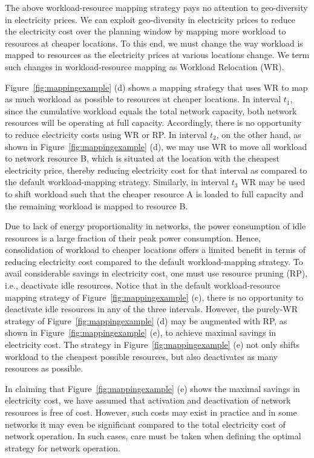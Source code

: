The above workload-resource mapping strategy pays no attention to geo-diversity in electricity prices. We can exploit geo-diversity in electricity prices to reduce the electricity cost over the planning window by mapping more workload to resources at cheaper locations. To this end, we must change the way workload is mapped to resources as the electricity prices at various locations change. We term such changes in workload-resource mapping as Workload Relocation (WR). 

Figure~\ref{fig:mappingexample} (d) shows a mapping strategy that uses WR to map as much workload as possible to resources at cheaper locations. In interval $t_1$, since the cumulative workload equals the total network capacity, both network resources will be operating at full capacity. Accordingly, there is no opportunity to reduce electricity costs using WR or RP. In interval $t_2$, on the other hand, as shown in Figure~\ref{fig:mappingexample} (d), we may use WR to move all workload to network resource B, which is situated at the location with the cheapest electricity price, thereby reducing electricity cost for that interval as compared to the default workload-mapping strategy. Similarly, in interval $t_3$ WR may be used to shift workload such that the cheaper resource A is loaded to full capacity and the remaining workload is mapped to resource B. 

Due to lack of energy proportionality in networks, the power consumption of idle resources is a large fraction of their peak power consumption. Hence, consolidation of workload to cheaper locations offers a limited benefit in terms of reducing electricity cost compared to the default workload-mapping strategy. To avail considerable savings in electricity cost, one must use resource pruning (RP), i.e., deactivate idle resources. Notice that in the default workload-resource mapping strategy of Figure~\ref{fig:mappingexample} (c), there is no opportunity to deactivate idle resources in any of the three intervals. However, the purely-WR strategy of Figure~\ref{fig:mappingexample} (d) may be augmented with RP, as shown in Figure~\ref{fig:mappingexample} (e), to achieve maximal savings in electricity cost. The strategy in Figure~\ref{fig:mappingexample} (e) not only shifts workload to the cheapest possible resources, but also deactivates as many resources as possible. 

In claiming that Figure~\ref{fig:mappingexample} (e) shows the maximal savings in electricity cost, we have assumed that activation and deactivation of network resources is free of cost. However, such costs may exist in practice and in some networks it may even be significant compared to the total electricity cost of network operation. In such cases, care must be taken when defining the optimal strategy for network operation. %

